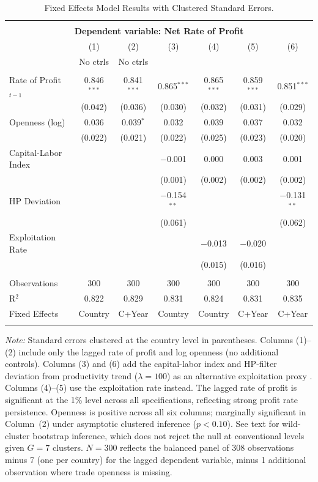 \documentclass[10pt]{article}
\begin{document}
\begin{table}[!htbp]
  \centering
  \caption{Fixed Effects Model Results with Clustered Standard Errors.}
  \label{table:fe_model_results_clustered}
  \begin{tabular}{@{\extracolsep{3pt}}lcccccc}
  \\[-1.8ex]\hline
  \hline \\[-1.8ex]
  \multicolumn{7}{c}{\textbf{Dependent variable: Net Rate of Profit}} \\
   & (1) & (2) & (3) & (4) & (5) & (6) \\
   & No ctrls & No ctrls & & & & \\
  \hline \\[-1.8ex]
  Rate of Profit$_{t-1}$ & 0.846$^{***}$ & 0.841$^{***}$ & 0.865$^{***}$ & 0.865$^{***}$ & 0.859$^{***}$ & 0.851$^{***}$ \\
    & (0.042) & (0.036) & (0.030) & (0.032) & (0.031) & (0.029) \\
  Openness (log) & 0.036 & 0.039$^{*}$ & 0.032 & 0.039 & 0.037 & 0.032 \\
    & (0.022) & (0.021) & (0.022) & (0.025) & (0.023) & (0.020) \\
  Capital-Labor Index &  &  & $-$0.001 & 0.000 & 0.003 & 0.001 \\
    &  &  & (0.001) & (0.002) & (0.002) & (0.002) \\
  HP Deviation &  &  & $-$0.154$^{**}$ &  &  & $-$0.131$^{**}$ \\
    &  &  & (0.061) &  &  & (0.062) \\
  Exploitation Rate &  &  &  & $-$0.013 & $-$0.020 & \\
    &  &  &  & (0.015) & (0.016) & \\
  \hline \\[-1.8ex]
  Observations & 300 & 300 & 300 & 300 & 300 & 300 \\
  R$^{2}$ & 0.822 & 0.829 & 0.831 & 0.824 & 0.831 & 0.835 \\
  Fixed Effects & Country & C+Year & Country & Country & C+Year & C+Year \\
  \hline
  \hline \\[-1.8ex]
  \end{tabular}
  \begin{minipage}[t]{\textwidth}
  \small
  \textit{Note:} Standard errors clustered at the country level in parentheses. Columns (1)--(2) include only the lagged rate of profit and log openness (no additional controls). Columns (3) and (6) add the capital-labor index and HP-filter deviation from productivity trend ($\lambda=100$) as an alternative exploitation proxy \citep{BasuManolakos2013}. Columns (4)--(5) use the exploitation rate instead. The lagged rate of profit is significant at the 1\% level across all specifications, reflecting strong profit rate persistence. Openness is positive across all six columns; marginally significant in Column~(2) under asymptotic clustered inference ($p<0.10$). See text for wild-cluster bootstrap inference, which does not reject the null at conventional levels given $G=7$ clusters. $N=300$ reflects the balanced panel of 308 observations minus 7 (one per country) for the lagged dependent variable, minus 1 additional observation where trade openness is missing. \\

\end{minipage}
\end{table}
\end{document}
